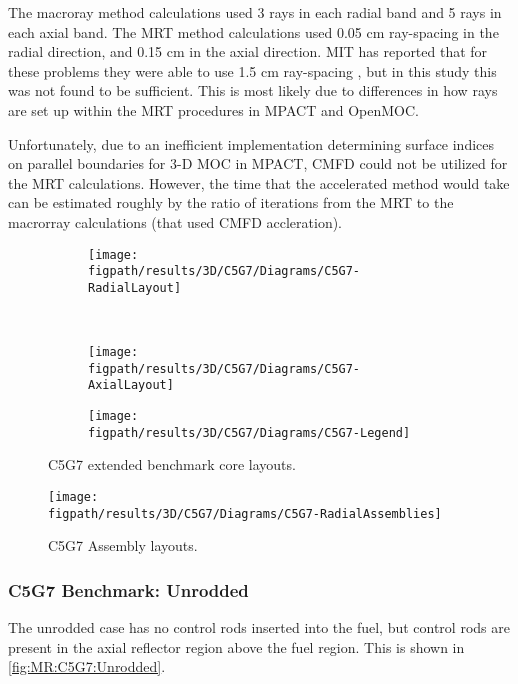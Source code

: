 {{{      The macroray method calculations used 3 rays in each radial band and 5 rays in each axial band.
      The \ac{MRT} method calculations used 0.05 cm ray-spacing in the radial direction, and 0.15 cm in the axial direction.
      \ac{MIT} has reported that for these problems they were able to use 1.5 cm ray-spacing \cite{Gunow2016}, but in this study this was not found to be sufficient.
      This is most likely due to differences in how rays are set up within the \ac{MRT} procedures in MPACT and OpenMOC.

      Unfortunately, due to an inefficient implementation determining surface indices on parallel boundaries for 3-D \ac{MOC} in MPACT, \ac{CMFD} could not be utilized for the \ac{MRT} calculations.
      However, the time that the accelerated method would take can be estimated roughly by the ratio of iterations from the \ac{MRT} to the macrorray calculations (that used \ac{CMFD} accleration).

      \begin{figure}[htbp]
        \centering
        \begin{subfigure}[t]{0.45\textwidth}
          \centering
          \texttt{[image: \\figpath/results/3D/C5G7/Diagrams/C5G7-RadialLayout]}
        \end{subfigure}%
        ~
        \begin{subfigure}[t]{0.45\textwidth}
          \centering
          \texttt{[image: \\figpath/results/3D/C5G7/Diagrams/C5G7-AxialLayout]}
        \end{subfigure}
        \begin{subfigure}[t]{0.65\textwidth}
          \centering
          \texttt{[image: \\figpath/results/3D/C5G7/Diagrams/C5G7-Legend]}
        \end{subfigure}
        \caption{C5G7 extended benchmark core layouts. \label{figs:MR:C5G7:Layout}}
      \end{figure}

      \begin{figure}[htbp]
        \centering
        \texttt{[image: \\figpath/results/3D/C5G7/Diagrams/C5G7-RadialAssemblies]}
        \caption{C5G7 Assembly layouts.\label{fig:MR:C5G7:RadialAssemblyLayout}}
      \end{figure}

      \subsubsection{C5G7 Benchmark: Unrodded}{\label{sssec:MR:C5G7:Unrodded}
        The unrodded case has no control rods inserted into the fuel, but control rods are present in the axial reflector region above the fuel region.
        This is shown in \cref{fig:MR:C5G7:Unrodded}.

}}}}
